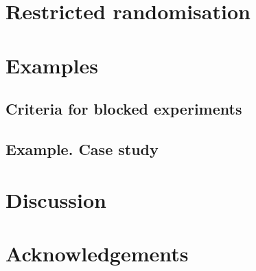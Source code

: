 \documentclass[11pt]{article}
\begin{document}
\section{Restricted randomisation}
\label{sec::ms_experiments}


\section{Examples}
\label{sec::examples}


\subsection{Criteria for blocked experiments}
\label{subsec::compound_blocked}


\subsection{Example. Case study}
\label{subsec::case_study}



\section{Discussion}
\label{sec::discussion}

\section{Acknowledgements}

\cleardoublepage
{}
{} 
%


\end{document}
